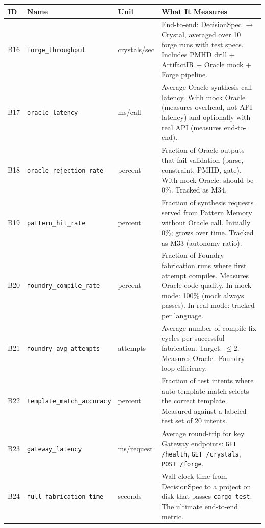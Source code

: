 \documentclass[11pt,a4paper,twoside]{article}
\theoremstyle{definition}
\theoremstyle{plain}
\theoremstyle{remark}
\begin{document}
\begin{longtable}{l l l p{5cm}}
\toprule
\textbf{ID} & \textbf{Name} & \textbf{Unit} & \textbf{What It Measures} \\
\midrule
\endfirsthead \midrule \endhead \bottomrule \endfoot

B16 & \texttt{forge\_throughput} & crystals/sec & End-to-end: DecisionSpec
  $\to$ Crystal, averaged over 10 forge runs with test specs. Includes
  PMHD drill + ArtifactIR + Oracle mock + Forge pipeline. \\

B17 & \texttt{oracle\_latency} & ms/call & Average Oracle synthesis
  call latency. With mock Oracle (measures overhead, not API latency)
  and optionally with real API (measures end-to-end). \\

B18 & \texttt{oracle\_rejection\_rate} & percent & Fraction of Oracle
  outputs that fail validation (parse, constraint, PMHD, gate). With
  mock Oracle: should be 0\%. Tracked as M34. \\

B19 & \texttt{pattern\_hit\_rate} & percent & Fraction of synthesis
  requests served from Pattern Memory without Oracle call. Initially
  0\%; grows over time. Tracked as M33 (autonomy ratio). \\

B20 & \texttt{foundry\_compile\_rate} & percent & Fraction of Foundry
  fabrication runs where first attempt compiles. Measures Oracle
  code quality. In mock mode: 100\% (mock always passes). In real
  mode: tracked per language. \\

B21 & \texttt{foundry\_avg\_attempts} & attempts & Average number of
  compile-fix cycles per successful fabrication. Target: $\le 2$.
  Measures Oracle+Foundry loop efficiency. \\

B22 & \texttt{template\_match\_accuracy} & percent & Fraction of
  test intents where auto-template-match selects the correct template.
  Measured against a labeled test set of 20 intents. \\

B23 & \texttt{gateway\_latency} & ms/request & Average round-trip
  for key Gateway endpoints: \texttt{GET /health},
  \texttt{GET /crystals}, \texttt{POST /forge}. \\

B24 & \texttt{full\_fabrication\_time} & seconds & Wall-clock time
  from DecisionSpec to a project on disk that passes
  \texttt{cargo test}. The ultimate end-to-end metric. \\

\end{longtable}
\end{document}
